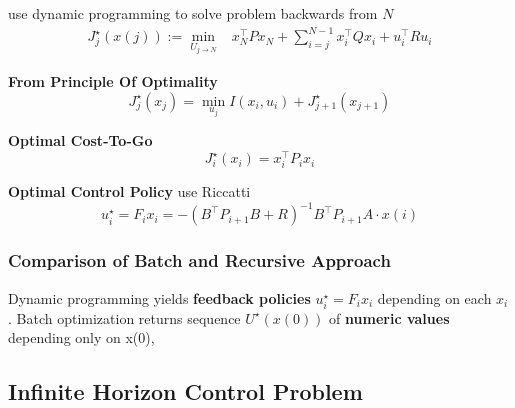 use dynamic programming to solve problem backwards from $N$
%
\begin{align*}
	J_j^\star(x(j)) :=
	\min_{U_{j\to N}} & x_N^\top P x_N \!+
	\sum_{i=j}^{N-1}x_i^\top Q x_i + u_i^\top R u_i
\end{align*}
%
\begin{minipage}[t]{0.64\linewidth}
	\textbf{From Principle Of Optimality}
	\[
		J_j^\star(x_j) =
		\min_{u_j} I(x_i,u_i) + J_{j+1}^\star(x_{j+1})
	\]
\end{minipage}
\begin{minipage}[t]{0.32\linewidth}
	\textbf{Optimal Cost-To-Go}
	\[
		J_i^\star(x_i) = x_i^\top P_i x_i
	\]
\end{minipage}
%
\textbf{Optimal Control Policy}
use Riccatti
\[
	u_i^\star = F_i x_i =
	-(B^\top P_{i+1}B + R)^{-1}
	B^\top P_{i+1} A \cdot x(i)
\]

\subsubsection{Comparison of Batch and Recursive Approach}

Dynamic programming yields \textbf{feedback policies}
$u_i^\star = F_i x_i$ depending on each $x_i$.
Batch optimization returns sequence $U^\star(x(0))$
of \textbf{numeric values} depending only on x(0),

\subsection{Infinite Horizon Control Problem}

